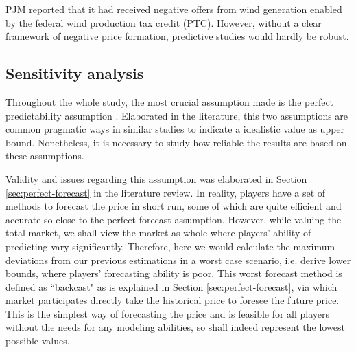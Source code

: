 PJM reported that it had received negative offers from wind generation enabled by the federal wind production tax credit (PTC)\cite{PJM_price_limit_1}. However, without a clear framework of negative price formation, predictive studies would hardly be robust. 

\subsection{Sensitivity analysis}
\label{sec:sensitivity}
Throughout the whole study, the most crucial assumption made is the perfect predictability assumption . Elaborated in the literature, this two assumptions are common pragmatic ways in similar studies to indicate a idealistic value as upper bound. Nonetheless, it is necessary to study how reliable the results are based on these assumptions. 

Validity and issues regarding this assumption was elaborated in Section \ref{sec:perfect-forecast} in the literature review. In reality, players have a set of methods to forecast the price in short run, some of which are quite efficient and accurate \cite{Weron2014} so close to the perfect forecast assumption. However, while valuing the total market, we shall view the market as whole where players' ability of predicting vary significantly. Therefore, here we would calculate the maximum deviations from our previous estimations in a worst case scenario, i.e. derive lower bounds, where players' forecasting ability is poor. This worst forecast method is defined as ``backcast" as is explained in Section \ref{sec:perfect-forecast}, via which market participates directly take the historical price to foresee the future price. This is the simplest way of forecasting the price and is feasible for all players without the needs for any modeling abilities, so shall indeed represent the lowest possible values.


